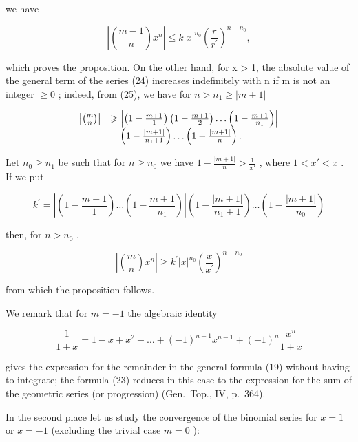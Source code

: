 we have

\[
\left| \binom {m - 1} {n} x ^ {n} \right| \leqslant k | x | ^ {n _ {0}} \left(\frac {r}{r ^ {\prime}}\right) ^ {n - n _ {0}},
\]

which proves the proposition. On the other hand, for x \textgreater{} 1, the absolute value of the general term of the series (24) increases indefinitely with n if m is not an integer \(\geqslant 0\) ; indeed, from (25), we have for \(n > n_{1} \geqslant |m + 1|\)

\[
\begin{array}{r l} \left| \binom {m} {n} \right| & \geqslant \left| \left(1 - \frac {m + 1}{1}\right) \left(1 - \frac {m + 1}{2}\right) \dots \left(1 - \frac {m + 1}{n _ {1}}\right) \right| \\ & \quad \left(1 - \frac {| m + 1 |}{n _ {1} + 1}\right) \dots \left(1 - \frac {| m + 1 |}{n}\right). \end{array}
\]

Let \(n_0 \geqslant n_1\) be such that for \(n \geqslant n_0\) we have \(1 - \frac{|m + 1|}{n} > \frac{1}{x'}\) , where \(1 < x' < x\) . If we put

\[
k ^ {\prime} = \left| \left(1 - \frac {m + 1}{1}\right) \dots \left(1 - \frac {m + 1}{n _ {1}}\right) \right| \left(1 - \frac {| m + 1 |}{n _ {1} + 1}\right) \dots \left(1 - \frac {| m + 1 |}{n _ {0}}\right)
\]

then, for \(n > n_0\) ,

\[
\left| \binom {m} {n} x ^ {n} \right| \geqslant k ^ {\prime} | x | ^ {n _ {0}} \left(\frac {x}{x ^ {\prime}}\right) ^ {n - n _ {0}}
\]

from which the proposition follows.

We remark that for \(m = -1\) the algebraic identity

\[
\frac {1}{1 + x} = 1 - x + x ^ {2} - \dots + (- 1) ^ {n - 1} x ^ {n - 1} + (- 1) ^ {n} \frac {x ^ {n}}{1 + x}\tag{26}
\]

gives the expression for the remainder in the general formula (19) without having to integrate; the formula (23) reduces in this case to the expression for the sum of the geometric series (or progression) (Gen.~Top., IV, p.~364).

In the second place let us study the convergence of the binomial series for \(x = 1\) or \(x = -1\) (excluding the trivial case \(m = 0\) ):

